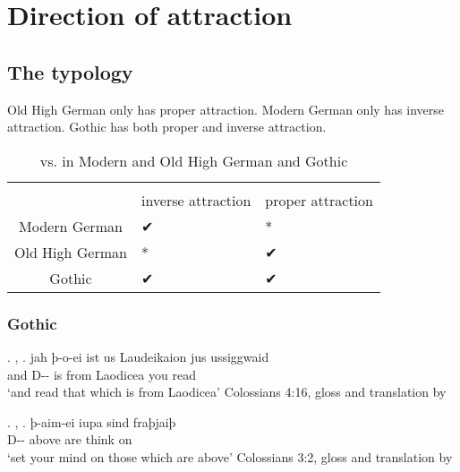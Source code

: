 
\chapter{Direction of attraction}


  \section{The typology}
Old High German only has proper attraction. Modern German only has inverse attraction. Gothic has both proper and inverse attraction.


\begin{table}[h]\label{tbl:intextgoth}
	\center
	\caption { vs.  in Modern and Old High German and Gothic}
	\begin{minipage}{\linewidth}
		\begin{tabularx}{\textwidth}{c *{2}{Y}}
		\toprule
		 								& 				& 				\\
										& inverse attraction	& proper attraction		\\
		\midrule
		Modern German 	& ✔			 							&	*										\\
		Old High German	& *										&	✔										\\
		Gothic					&	✔										&	✔										\\
		\bottomrule
		\end{tabularx}
	\end{minipage}
\end{table}




\subsection{Gothic}

\ex. , 
\ag. jah þ-o-ei ist us Laudeikaion jus ussiggwaid\\
 and D-- is\scsub{[nom]} from Laodicea you read\scsub{[acc]}\\
 `and read that which is from Laodicea' \hfill Colossians 4:16, gloss and translation by \citealt[357]{harbert1978}

 \ex. , 
 \ag. þ-aim-ei iupa sind fraþjaiþ\\
  D-- above are\scsub{[nom]} {think on}\scsub{[dat]}\\
  `set your mind on those which are above' \hfill Colossians 3:2, gloss and translation by \citealt[339]{harbert1978}

